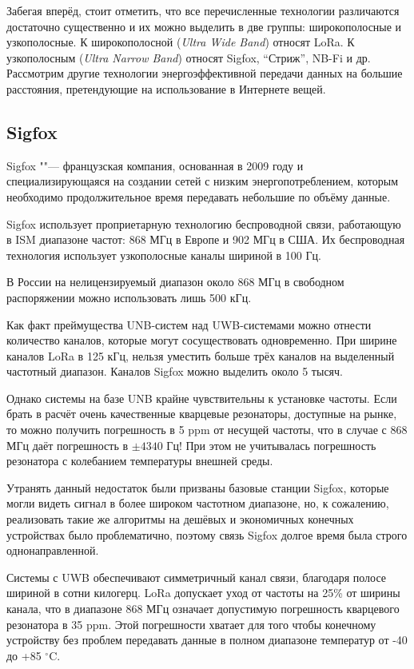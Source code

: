 Забегая вперёд, стоит отметить, что все перечисленные технологии различаются 
достаточно существенно и их можно выделить в две группы: широкополосные и 
узкополосные.
К широкополосной (\textit{Ultra Wide Band}) относят LoRa.
К узкополосным (\textit{Ultra Narrow Band}) относят Sigfox, ``Стриж'', NB-Fi и 
др.
Рассмотрим другие технологии энергоэффективной передачи данных на большие 
расстояния, претендующие на использование в Интернете вещей.

\subsection{Sigfox}

Sigfox ""--- французская компания, основанная в 2009 году и специализирующаяся 
на создании сетей с низким энергопотреблением, которым необходимо 
продолжительное время передавать небольшие по объёму данные.

Sigfox использует проприетарную технологию беспроводной связи, работающую в ISM 
диапазоне частот: 868 МГц в Европе и 902 МГц в США. 
Их беспроводная технология использует узкополосные каналы шириной в 100 Гц.

В России на нелицензируемый диапазон около 868 МГц в свободном распоряжении 
можно использовать лишь 500 кГц.

Как факт преймущества UNB-систем над UWB-системами можно отнести количество 
каналов, которые могут сосуществовать одновременно. При ширине каналов LoRa в 
125 кГц, нельзя уместить больше трёх каналов на выделенный частотный диапазон. 
Каналов Sigfox можно выделить около 5 тысяч.

Однако системы на базе UNB крайне чувствительны к установке частоты. 
Если брать в расчёт очень качественные кварцевые резонаторы, доступные на 
рынке, то можно получить погрешность в 5 ppm от несущей частоты, что в случае с 
868 МГц даёт погрешность в $\pm 4340$ Гц! При этом не учитывалась погрешность 
резонатора с колебанием температуры внешней среды. 

Утранять данный недостаток были призваны базовые станции Sigfox, которые могли 
видеть сигнал в более широком частотном диапазоне, но, к сожалению, реализовать 
такие же алгоритмы на дешёвых и экономичных конечных устройствах было 
проблематично, поэтому связь Sigfox долгое время была строго однонаправленной.

Системы с UWB обеспечивают симметричный канал связи, благодаря полосе шириной в 
сотни килогерц. 
LoRa допускает уход от частоты на 25\% от ширины канала, что в 
диапазоне 868 МГц означает допустимую погрешность кварцевого резонатора в 35 
ppm. 
Этой погрешности хватает для того чтобы конечному устройству без проблем 
передавать данные в полном диапазоне температур от -40 до +85 $^\circ$C.

